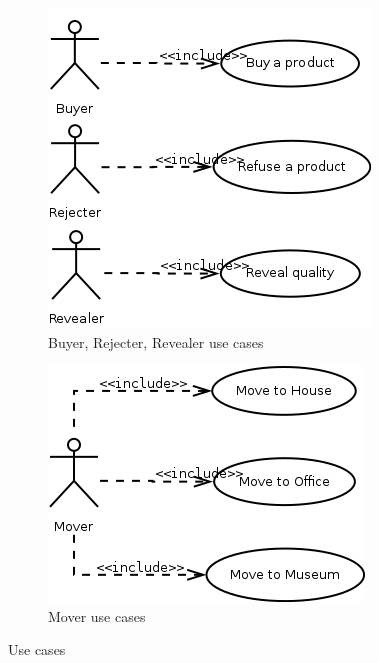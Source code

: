 \documentclass[a4paper,11pt]{report}
\begin{document}
\begin{figure}[ht!]
    \begin{subfigure}{0.5\textwidth}
       \centering
       \includegraphics[width=\textwidth]{media/use_cases_3.png}
       \caption{Buyer, Rejecter, Revealer use cases}
       \label{figure:use_cases_3}
    \end{subfigure}
    \begin{subfigure}{0.5\textwidth}
       \centering
       \includegraphics[width=\textwidth]{media/use_cases_4.png}
       \caption{Mover use cases}
       \label{figure:use_cases_4}
    \end{subfigure}

    \caption{Use cases}
    \label{figure:use_cases}
  \end{figure}
\end{document}
